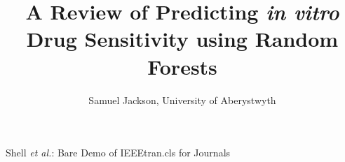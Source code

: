 \documentclass[journal]{IEEEtran}
\begin{document}
%
\title{A Review of Predicting \textit{in vitro} Drug Sensitivity using Random Forests}
%
%
%

\author{Samuel Jackson, University of Aberystwyth}

% 
%



\markboth{\today}%
{Shell \MakeLowercase{\textit{et al.}}: Bare Demo of IEEEtran.cls for Journals}
% 




\end{document}
